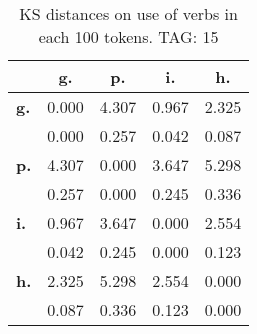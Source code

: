 \begin{table}[h!]
\begin{center}
\begin{tabular}{| l || c | c | c | c |}\hline
 & {\bf g.} & {\bf p.} & {\bf i.} & {\bf h.} \\\hline\hline
{\bf g.} & 0.000 & 4.307 & 0.967 & 2.325 \\
{\bf } & 0.000 & 0.257 & 0.042 & 0.087 \\\hline
{\bf p.} & 4.307 & 0.000 & 3.647 & 5.298 \\
{\bf } & 0.257 & 0.000 & 0.245 & 0.336 \\\hline
{\bf i.} & 0.967 & 3.647 & 0.000 & 2.554 \\
{\bf } & 0.042 & 0.245 & 0.000 & 0.123 \\\hline
{\bf h.} & 2.325 & 5.298 & 2.554 & 0.000 \\
{\bf } & 0.087 & 0.336 & 0.123 & 0.000 \\\hline
\end{tabular}
\caption{KS distances on use of verbs in each 100 tokens. TAG: 15}
\end{center}
\end{table}